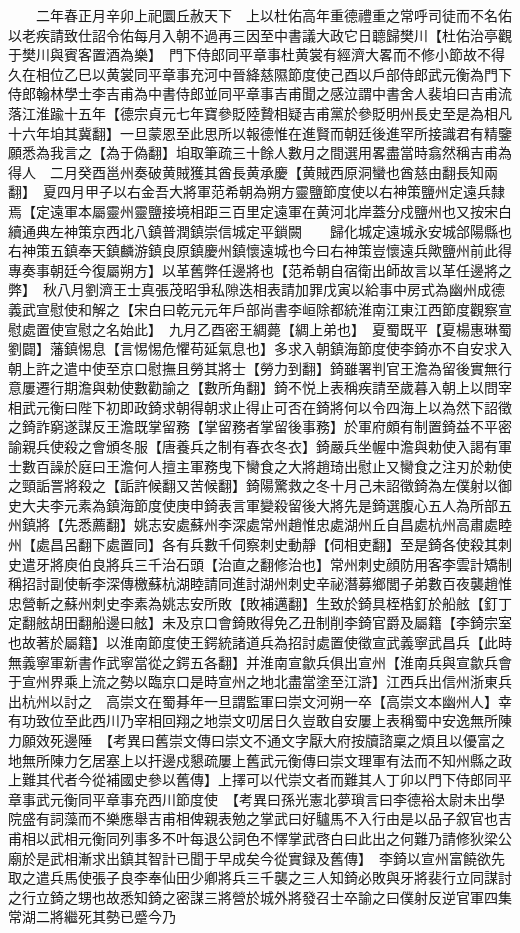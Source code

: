 　　二年春正月辛卯上祀圜丘赦天下　上以杜佑高年重德禮重之常呼司徒而不名佑以老疾請致仕詔令佑每月入朝不過再三因至中書議大政它日聼歸樊川【杜佑治亭觀于樊川與賓客置酒為樂】　門下侍郎同平章事杜黄裳有經濟大畧而不修小節故不得久在相位乙巳以黄裳同平章事充河中晉絳慈隰節度使己酉以戶部侍郎武元衡為門下侍郎翰林學士李吉甫為中書侍郎並同平章事吉甫聞之感泣謂中書舍人裴垍曰吉甫流落江淮踰十五年【德宗貞元七年寶參貶陸贄相疑吉甫黨於參貶明州長史至是為相凡十六年垍其冀翻】一旦蒙恩至此思所以報德惟在進賢而朝廷後進罕所接識君有精鑒願悉為我言之【為于偽翻】垍取筆疏三十餘人數月之間選用畧盡當時翕然稱吉甫為得人　二月癸酉邕州奏破黄賊獲其酋長黄承慶【黄賊西原洞蠻也酋慈由翻長知兩翻】　夏四月甲子以右金吾大將軍范希朝為朔方靈鹽節度使以右神策鹽州定遠兵隸焉【定遠軍本屬靈州靈鹽接境相距三百里定遠軍在黄河北岸蓋分戍鹽州也又按宋白續通典左神策京西北八鎮普潤鎮崇信城定平鎖闕　　歸化城定遠城永安城郃陽縣也右神策五鎮奉天鎮麟游鎮良原鎮慶州鎮懷遠城也今曰右神策豈懷遠兵歟鹽州前此得專奏事朝廷今復屬朔方】以革舊弊任邊將也【范希朝自宿衛出師故言以革任邊將之弊】　秋八月劉濟王士真張茂昭爭私隙迭相表請加罪戊寅以給事中房式為幽州成德義武宣慰使和解之【宋白曰乾元元年戶部尚書李峘除都統淮南江東江西節度觀察宣慰處置使宣慰之名始此】　九月乙酉密王綢薨【綢上弟也】　夏蜀既平【夏楊惠琳蜀劉闢】藩鎮惕息【言惕惕危懼苟延氣息也】多求入朝鎮海節度使李錡亦不自安求入朝上許之遣中使至京口慰撫且勞其將士【勞力到翻】錡雖署判官王澹為留後實無行意屢遷行期澹與勅使數勸諭之【數所角翻】錡不悦上表稱疾請至歲暮入朝上以問宰相武元衡曰陛下初即政錡求朝得朝求止得止可否在錡將何以令四海上以為然下詔徵之錡詐窮遂謀反王澹既掌留務【掌留務者掌留後事務】於軍府頗有制置錡益不平密諭親兵使殺之會頒冬服【唐養兵之制有春衣冬衣】錡嚴兵坐幄中澹與勅使入謁有軍士數百譟於庭曰王澹何人擅主軍務曳下臠食之大將趙琦出慰止又臠食之注刃於勅使之頸詬詈將殺之【詬許候翻又苦候翻】錡陽驚救之冬十月己未詔徵錡為左僕射以御史大夫李元素為鎮海節度使庚申錡表言軍變殺留後大將先是錡選腹心五人為所部五州鎮將【先悉薦翻】姚志安處蘇州李深處常州趙惟忠處湖州丘自昌處杭州高肅處睦州【處昌呂翻下處置同】各有兵數千伺察刺史動靜【伺相吏翻】至是錡各使殺其刺史遣牙將庾伯良將兵三千治石頭【治直之翻修治也】常州刺史顔防用客李雲計矯制稱招討副使斬李深傳檄蘇杭湖睦請同進討湖州刺史辛祕潛募鄉閭子弟數百夜襲趙惟忠營斬之蘇州刺史李素為姚志安所敗【敗補邁翻】生致於錡具桎梏釘於船舷【釘丁定翻舷胡田翻船邊曰舷】未及京口會錡敗得免乙丑制削李錡官爵及屬籍【李錡宗室也故著於屬籍】以淮南節度使王鍔統諸道兵為招討處置使徵宣武義寧武昌兵【此時無義寧軍新書作武寧當從之鍔五各翻】并淮南宣歙兵俱出宣州【淮南兵與宣歙兵會于宣州界乘上流之勢以臨京口是時宣州之地北盡當塗至江滸】江西兵出信州浙東兵出杭州以討之　高崇文在蜀朞年一旦謂監軍曰崇文河朔一卒【高崇文本幽州人】幸有功致位至此西川乃宰相回翔之地崇文叨居日久豈敢自安屢上表稱蜀中安逸無所陳力願效死邊陲　【考異曰舊崇文傳曰崇文不通文字厭大府按牘諮稟之煩且以優富之地無所陳力乞居塞上以扞邊戍懇疏屢上舊武元衡傳曰崇文理軍有法而不知州縣之政上難其代者今從補國史參以舊傳】上擇可以代崇文者而難其人丁卯以門下侍郎同平章事武元衡同平章事充西川節度使　【考異曰孫光憲北夢瑣言曰李德裕太尉未出學院盛有詞藻而不樂應舉吉甫相俾親表勉之掌武曰好驢馬不入行由是以品子叙官也吉甫相以武相元衡同列事多不叶每退公詞色不懌掌武啓白曰此出之何難乃請修狄梁公廟於是武相漸求出鎮其智計已聞于早成矣今從實録及舊傳】　李錡以宣州富饒欲先取之遣兵馬使張子良李奉仙田少卿將兵三千襲之三人知錡必敗與牙將裴行立同謀討之行立錡之甥也故悉知錡之密謀三將營於城外將發召士卒諭之曰僕射反逆官軍四集常湖二將繼死其勢已蹙今乃